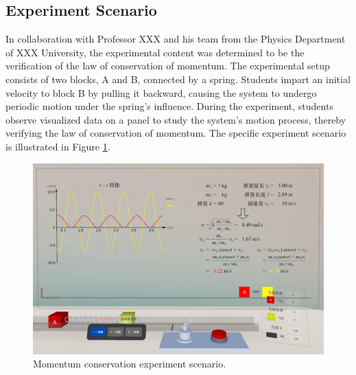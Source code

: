 \documentclass[sigconf,review,anonymous]{acmart}
\begin{document}
\subsection{Experiment Scenario}
In collaboration with Professor XXX %
and his team from the Physics Department of XXX
University, the experimental content was determined to be the verification of the law of conservation of momentum. The experimental setup consists of two blocks, A and B, connected by a spring. Students impart an initial velocity to block B by pulling it backward, causing the system to undergo periodic motion under the spring's influence. During the experiment, students observe visualized data on a panel to study the system's motion process, thereby verifying the law of conservation of momentum. The specific experiment scenario is illustrated in Figure \ref{fig:experiment-scenario}.

\begin{figure}[h]
  \centering
  \includegraphics[width=\linewidth]{image/experiment-scenario.pdf}
  \caption{Momentum conservation experiment scenario.}
  \label{fig:experiment-scenario}
\end{figure}
\end{document}
